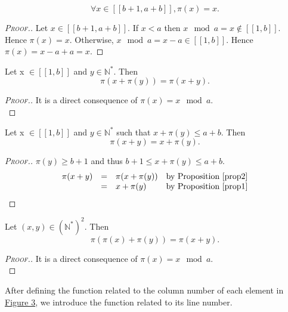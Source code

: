 \begin{proposition}
\label{prop1}
\[
\forall x \in [\![b + 1, a + b]\!], \pi(x) = x.
\]
\end{proposition}

\begin{proof}[\textsc{Proof.}]
\begin{sloppypar}
Let \(x \in [\![b + 1, a + b]\!]\). If \(x < a\) then \(x \mod a = x \notin [\![1, b]\!]\). Hence \(\pi(x) = x\).
Otherwise, \({x \mod a = x - a \in [\![1, b]\!]}\). Hence \({\pi(x) = x - a + a = x}\).
\end{sloppypar}
\end{proof}

\begin{proposition}
\label{prop2}
Let x \(\in [\![1,b]\!]\) and \(y \in \mathbb{N}^*\). Then
\[
\pi(x+\pi(y)) = \pi(x+y).
\]
\end{proposition}

\begin{proof}[\textsc{Proof.}]
It is a direct consequence of \(\pi(x) = x \mod a\). \\
\end{proof}

\begin{proposition}
\label{prop3}
Let x \(\in [\![1,b]\!]\) and \(y \in \mathbb{N}^*\) such that \(x+\pi(y) \leqslant a+b\). Then
\[
\pi(x+y)=x+\pi(y).
\]
\end{proposition}

\begin{proof}[\textsc{Proof.}]
\(\pi(y) \geqslant b + 1\) and thus \(b + 1 \leqslant x + \pi(y) \leqslant a + b\).
\[
\begin{array}{l l l l}
	\pi(x + y) & = & \pi(x + \pi(y)) & \text{by Proposition \ref{prop2}} \\
	 & = & x + \pi(y) & \text{by Proposition \ref{prop1}}
\end{array}
\]
\end{proof}

\begin{proposition}
\label{prop4}
Let \((x,y)\in (\mathbb{N}^*)^2\). Then
\[
\pi(\pi(x)+\pi(y))=\pi(x+y).
\]
\end{proposition}

\begin{proof}[\textsc{Proof.}]
It is a direct consequence of \(\pi(x) = x \mod a\). \\
\end{proof}

After defining the function related to the column number of each element in \hyperref[SchemaWS]{Figure 3},
we introduce the function related to its line number.

